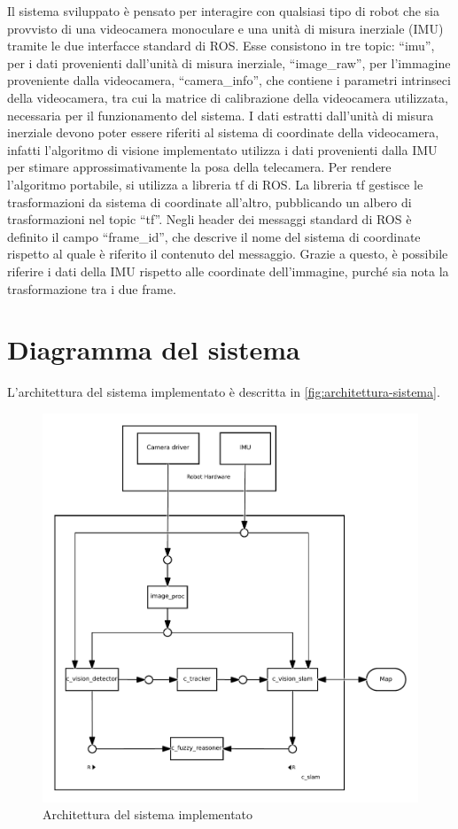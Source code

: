 Il sistema sviluppato è pensato per interagire con qualsiasi tipo di robot che sia provvisto di una videocamera monoculare e una unità di misura inerziale (IMU) tramite le due interfacce standard di ROS.
Esse consistono in tre topic: ``imu'', per i dati provenienti dall'unità di misura inerziale, ``image\_raw'', per l'immagine proveniente dalla videocamera, ``camera\_info'', che contiene i parametri intrinseci della videocamera, tra cui la matrice di calibrazione della videocamera utilizzata, necessaria per il funzionamento del sistema.
I dati estratti dall'unità di misura inerziale devono poter essere riferiti al sistema di coordinate della videocamera, infatti l'algoritmo di visione implementato utilizza i dati provenienti dalla IMU per stimare approssimativamente la posa della telecamera.
Per rendere l'algoritmo portabile, si utilizza a libreria tf di ROS. La libreria tf gestisce le trasformazioni da sistema di coordinate all'altro, pubblicando un albero di trasformazioni nel topic ``tf''.
Negli header dei messaggi standard di ROS è definito il campo ``frame\_id'', che descrive il nome del sistema di coordinate rispetto al quale è riferito il contenuto del messaggio. Grazie a questo, è possibile riferire i dati della IMU rispetto alle coordinate dell'immagine, purché sia nota la trasformazione tra i due frame.

\section{Diagramma del sistema}

L'architettura del sistema implementato è descritta in \autoref{fig:architettura-sistema}. \\
\begin{figure}[ht]
  \includegraphics[width=\textwidth]{diagrammi/Sistema}
  \caption{Architettura del sistema implementato}
  \label{fig:architettura-sistema}
\end{figure}


